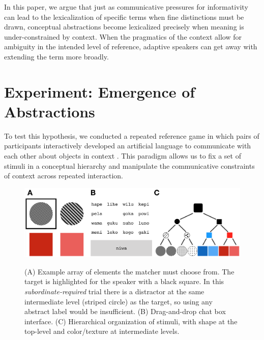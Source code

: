 \documentclass[10pt,letterpaper]{article}
\begin{document}


In this paper, we argue that just as communicative pressures for informativity can lead to the lexicalization of specific terms when fine distinctions must be drawn, conceptual abstractions become lexicalized precisely when meaning is under-constrained by context. When the pragmatics of the context allow for ambiguity in the intended level of reference, adaptive speakers can get away with extending the term more broadly. 
			
\section{Experiment: Emergence of Abstractions}

To test this hypothesis, we conducted a repeated reference game in which pairs of participants interactively developed an artificial language to communicate with each other about objects in context \cite{WintersKirbySmith14_LanguagesAdapt, GalantucciGarrod11_ExperimentalSemiotics}. This paradigm allows us to fix a set of stimuli in a conceptual hierarchy and manipulate the communicative constraints of context across repeated interaction.

\begin{figure}[t]
\begin{center}
{\includegraphics[scale=.64]{fig.png}}
{\caption{\footnotesize{(A) Example array of elements the matcher must choose from. The target is highlighted for the speaker with a black square. In this \emph{subordinate-required} trial there is a distractor at the same intermediate level (striped circle) as the target, so using any abstract label would be insufficient. (B) Drag-and-drop chat box interface. (C) Hierarchical organization of stimuli, with shape at the top-level and color/texture at intermediate levels.  \label{exp}}}}
\end{center}
\end{figure}
\end{document}
